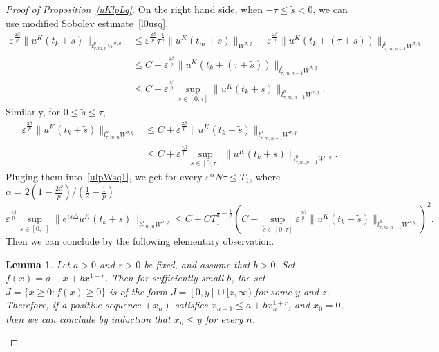 \documentclass[10pt,a4paper]{article}
\newtheorem{lemma}[theorem]{Lemma}
\begin{document}
\begin{proof}[Proof of Proposition~\ref{uKlpLq}]
    On the right hand side, when \(-\tau \leq \tilde s<0\), we can use modified Sobolev 
    estimate~\eqref{l0usq},
    \begin{equation*}
      \begin{aligned}
        \varepsilon^{\frac{2\beta}p} \|u^K(t_k+\tilde{s})\|_{l^p_{\tau,m,n}W^{\sigma,q}}
        &\leq \varepsilon^{\frac{2\beta}p} \tau^\frac1p \|u^K(t_m+\tilde{s})\|_{W^{\sigma,q}}
        + \varepsilon^{\frac{2\beta}p} \|u^K(t_k+(\tau+\tilde{s}))\|_{l^p_{\tau,m,n-1}W^{\sigma,q}} \\
        &\leq C + \varepsilon^{\frac{2\beta}p} \|u^K(t_k+(\tau+\tilde{s}))\|_{l^p_{\tau,m,n-1}W^{\sigma,q}} \\
        &\leq C + \varepsilon^{\frac{2\beta}p} \sup_{s \in [0,\tau]} \|u^K(t_k+s)\|_{l^p_{\tau,m,n-1}W^{\sigma,q}}.
      \end{aligned}
    \end{equation*}
    Similarly, for \( 0\leq\tilde{s}\leq \tau\), 
    \begin{equation*}
      \begin{aligned}
        \varepsilon^{\frac{2\beta}p} \|u^K(t_k+\tilde{s})\|_{l^p_{\tau,m,n}W^{\sigma,q}}
        &\leq C + \varepsilon^{\frac{2\beta}p} \|u^K(t_k+\tilde{s})\|_{l^p_{\tau,m,n-1}W^{\sigma,q}} \\
        &\leq C + \varepsilon^{\frac{2\beta}p} \sup_{s \in [0,\tau]} \|u^K(t_k+s)\|_{l^p_{\tau,m,n-1}W^{\sigma,q}}.
      \end{aligned}
    \end{equation*}
    Pluging them into~\eqref{ulpWsq1}, we get for every \(\varepsilon^\alpha N \tau \leq
    T_1 \), where \(\alpha = {2(1-\frac{2\beta}p)}/(\frac12-\frac1p)\)
    \begin{equation}\label{ulpWsq2}
      \varepsilon^{\frac{2\beta}p}\sup_{s\in[0,\tau]}\|e^{i\hat s\Delta}u^K(t_k+s)\|_{l^p_{\tau,m,n}W^{\sigma,q}} 
      \leq C + C T_1^{\frac12-\frac1p}
      \left(C + \sup_{\tilde{s} \in [0, \tau]} \varepsilon^{\frac{2\beta}p}
      \|u^K(t_k+\tilde{s})\|_{l^p_{\tau,m,n-1}W^{\sigma,q}}\right)^2.
    \end{equation}
    Then we can conclude by the following elementary observation. 

    \begin{lemma}\label{observation}
      Let \(a>0\) and \(r>0\) be fixed, and assume that \(b>0\). Set
      \(f(x)=a-x+bx^{1+r}\). Then for sufficiently small \(b\), the set 
      \(J = \{x\geq0:f(x)\geq0\}\) is of the form \(J=[0,y]\cup[z,\infty)\) for
      some \(y\) and \(z\). Therefore, if a positive sequence \((x_n)\) satisfies 
      \(x_{n+1} \leq a + b x_n^{1+r}\), and \(x_0=0\), then we can conclude by
      induction that \(x_n\leq y\) for every \(n\).
    \end{lemma}


\end{proof}
\end{document}
